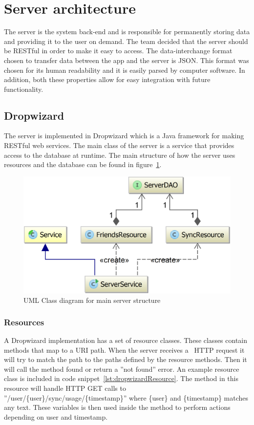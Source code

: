 \section{Server architecture}
\label{sec:arch_server}
The server is the system back-end and is responsible for permanently storing data and providing it to the user on demand. The team decided that the server should be RESTful in order to make it easy to access. The data-interchange format chosen to transfer data between the app and the server is JSON. This format was chosen for its human readability and it is easily parsed by computer software. In addition, both these properties allow for easy integration with future functionality.

\subsection{Dropwizard}
The server is implemented in Dropwizard which is a Java framework for making RESTful web services. The main class of the server is a service that provides access to the database at runtime. The main structure of how the server uses resources and the database can be found in figure~\ref{fig:classDiagramServer}.

\begin{figure}[H]
\includegraphics[width=\textwidth]{ch/architecture/fig/classDiagramServer.png}
\caption{UML Class diagram for main server structure}
\label{fig:classDiagramServer}
\end{figure}

\subsubsection{Resources}
A Dropwizard implementation has a set of resource classes. These classes contain methods that map to a URI path. When the server receives a ~\gls{HTTP} request it will try to match the path to the paths defined by the resource methods. Then it will call the method found or return a ''not found'' error. An example resource class is included in code snippet~\ref{lst:dropwizardResource}. The method in this resource will handle HTTP GET calls to ''/user/\{user\}/sync/usage/\{timestamp\}'' where \{user\} and \{timestamp\} matches any text. These variables is then used inside the method to perform actions depending on user and timestamp.
\newline

